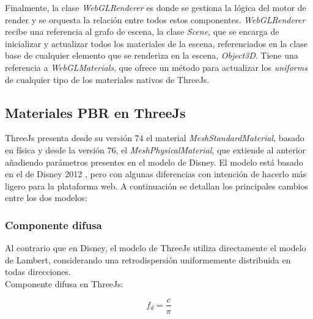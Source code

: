 Finalmente, la clase \textit{WebGLRenderer} es donde se gestiona la l\'ogica del motor de render y se orquesta la relaci\'on entre todos
estos componentes. \textit{WebGLRenderer} recibe una referencia al grafo de escena, la clase \textit{Scene}, que se encarga de inicializar
y actualizar todos los materiales de la escena, referenciados en la clase base de cualquier elemento que se renderiza en la escena, \textit{Object3D}.
Tiene una referencia a \textit{WebGLMaterials}, que ofrece un m\'etodo para actualizar los \textit{uniforms} de cualquier tipo
de los materiales nativos de ThreeJs.





\subsection{Materiales PBR en ThreeJs}
ThreeJs presenta desde su versi\'on 74 el material \textit{MeshStandardMaterial}, basado en f\'isica y desde la versi\'on
76, el \textit{MeshPhysicalMaterial}, que extiende al anterior a\~nadiendo par\'ametros presentes en el modelo de Disney.
El modelo est\'a basado en el de Disney 2012 \autocite{disney12}, pero con algunas diferencias con intenci\'on de hacerlo m\'as ligero
para la plataforma web. A continuaci\'on se detallan los principales cambios entre los dos modelos:

  \subsubsection{Componente difusa}
  Al contrario que en Disney, el modelo de ThreeJs utiliza directamente el modelo de Lambert, considerando una retrodispersi\'on
  uniformemente distribuida en todas direcciones.\\

  Componente difusa en ThreeJs:

  \begin{equation}
    f_d = \frac{c}{\pi}
  \end{equation}
  \singlespacing

